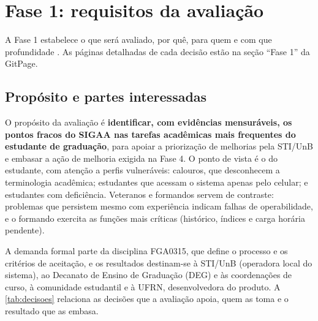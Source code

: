 \chapter{Fase 1: requisitos da avaliação}
\label{cap:fase1}

A Fase 1 estabelece o que será avaliado, por quê, para quem e com que profundidade \cite{iso25040,ramos2026processo}. As páginas detalhadas de cada decisão estão na seção ``Fase 1'' da GitPage.

\section{Propósito e partes interessadas}
\label{sec:proposito}

O propósito da avaliação é \textbf{identificar, com evidências mensuráveis, os pontos fracos do SIGAA nas tarefas acadêmicas mais frequentes do estudante de graduação}, para apoiar a priorização de melhorias pela STI/UnB e embasar a ação de melhoria exigida na Fase 4. O ponto de vista é o do estudante, com atenção a perfis vulneráveis: calouros, que desconhecem a terminologia acadêmica; estudantes que acessam o sistema apenas pelo celular; e estudantes com deficiência. Veteranos e formandos servem de contraste: problemas que persistem mesmo com experiência indicam falhas de operabilidade, e o formando exercita as funções mais críticas (histórico, índices e carga horária pendente).

A demanda formal parte da disciplina FGA0315, que define o processo e os critérios de aceitação, e os resultados destinam-se à STI/UnB (operadora local do sistema), ao Decanato de Ensino de Graduação (DEG) e às coordenações de curso, à comunidade estudantil e à UFRN, desenvolvedora do produto. A \autoref{tab:decisoes} relaciona as decisões que a avaliação apoia, quem as toma e o resultado que as embasa.

